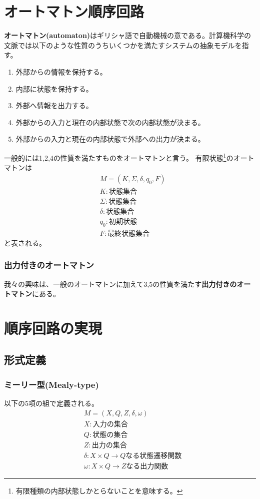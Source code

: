 \documentclass[a4j,10pt,oneside,openany,fleqn]{jsbook}
\begin{document}
\section{オートマトン順序回路}
\textbf{オートマトン(automaton)}はギリシャ語で自動機械の意である。計算機科学の文脈では以下のような性質のうちいくつかを満たすシステムの抽象モデルを指す。
\begin{enumerate}
  \item 外部からの情報を保持する。
  \item 内部に状態を保持する。
  \item 外部へ情報を出力する。
  \item 外部からの入力と現在の内部状態で次の内部状態が決まる。
  \item 外部からの入力と現在の内部状態で外部への出力が決まる。
\end{enumerate}
一般的には1,2,4の性質を満たすものをオートマトンと言う。
有限状態\footnote{有限種類の内部状態しかとらないことを意味する。}のオートマトンは
\begin{align*}
  &M = (K, \Sigma, \delta, q_0, F)\\
  &K:\textrm{状態集合}\\
  &\Sigma:\textrm{状態集合}\\
  &\delta:\textrm{状態集合}\\
  &q_0:\textrm{初期状態}\\
  &F:\textrm{最終状態集合}
\end{align*}
と表される。

\subsubsection{出力付きのオートマトン}
我々の興味は、一般のオートマトンに加えて3,5の性質を満たす\textbf{出力付きのオートマトン}にある。

\section{順序回路の実現}
\subsection{形式定義}
\subsubsection{ミーリー型(Mealy-type)}
以下の5項の組で定義される。
\begin{align*}
  &M = (X, Q, Z, \delta, \omega)\\
  &X:\textrm{入力の集合}\\
  &Q:\textrm{状態の集合}\\
  &Z:\textrm{出力の集合}\\
  &\delta:X \times Q \rightarrow Q\textrm{なる状態遷移関数}\\
  &\omega:X \times Q \rightarrow Z\textrm{なる出力関数}
\end{align*}
\end{document}
